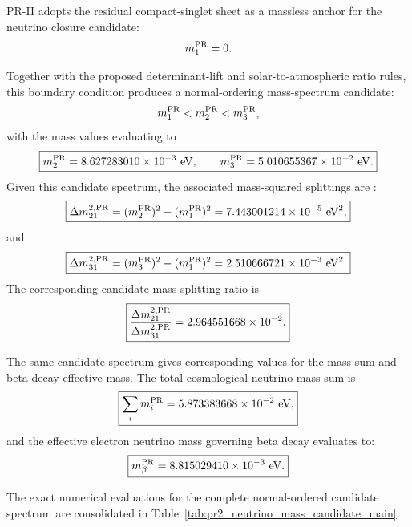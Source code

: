 \documentclass[11pt]{article}
\begin{document}
PR-II adopts the residual compact-singlet sheet as a massless anchor for the neutrino closure candidate:
\begin{equation}
m_1^{\rm PR} = 0.
\end{equation}

Together with the proposed determinant-lift and solar-to-atmospheric ratio rules, this boundary condition produces a normal-ordering mass-spectrum candidate:
\begin{equation}
m_1^{\rm PR} < m_2^{\rm PR} < m_3^{\rm PR},
\end{equation}
with the mass values evaluating to
\begin{equation}
\boxed{
m_2^{\rm PR}
=
8.627283010\times10^{-3}\ {\rm eV},
\qquad
m_3^{\rm PR}
=
5.010655367\times10^{-2}\ {\rm eV}.
}
\end{equation}
Given this candidate spectrum, the associated mass-squared splittings are \cite{EstebanNuFIT2024}:
\begin{equation}
\boxed{
\Delta m_{21}^{2,{\rm PR}}
=
(m_2^{\rm PR})^2
-
(m_1^{\rm PR})^2
=
7.443001214\times10^{-5}\ {\rm eV}^2,
}
\end{equation}
and
\begin{equation}
\boxed{
\Delta m_{31}^{2,{\rm PR}}
=
(m_3^{\rm PR})^2
-
(m_1^{\rm PR})^2
=
2.510666721\times10^{-3}\ {\rm eV}^2.
}
\end{equation}
The corresponding candidate mass-splitting ratio is
\begin{equation}
\boxed{
\frac{
\Delta m_{21}^{2,{\rm PR}}
}{
\Delta m_{31}^{2,{\rm PR}}
}
=
2.964551668\times10^{-2}.
}
\end{equation}

The same candidate spectrum gives corresponding values for the mass sum and beta-decay effective mass. The total cosmological neutrino mass \cite{Planck2018Cosmology} sum is
\begin{equation}
\boxed{
\sum_i m_i^{\rm PR}
=
5.873383668\times10^{-2}\ {\rm eV},
}
\end{equation}
and the effective electron neutrino mass governing beta decay evaluates to:
\begin{equation}
\boxed{
m_\beta^{\rm PR}
=
8.815029410\times10^{-3}\ {\rm eV}.
}
\end{equation}

The exact numerical evaluations for the complete normal-ordered candidate spectrum are consolidated in Table~\ref{tab:pr2_neutrino_mass_candidate_main}.
\end{document}
